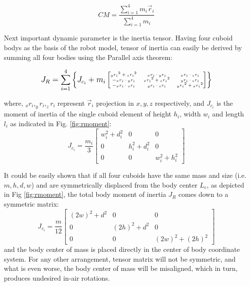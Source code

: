 \begin{equation}\label{eq:CMrobot}
CM=\frac{\sum_{i=1}^{4}m_i\vec{r}_i}{\sum_{i=1}^{4}m_i}
\end{equation}

Next important dynamic parameter is the inertia tensor. Having four cuboid bodys as the basis of the robot model, tensor of inertia can easily be derived by summing all four bodies using the Parallel axis theorem:

\begin{equation}
\tiny
J_R=\sum_{i=1}^{4}\left \{J_{c_i}+m_i\begin{bmatrix}
{_yr_i}^2+{_zr_i}^2 & {_xr_i}\cdot {_yr_i} & {_xr_i}\cdot {_zr_i} \\ 
-{_xr_i}\cdot {_yr_i} & {_xr_i}^2+{_zr_i}^2 & {_yr_i}\cdot {_zr_i}\\ 
-{_xr_i}\cdot {_zr_i} & {_yr_i}\cdot {_zr_i} & {_yr_i}^2+{_xr_i}^2
\end{bmatrix} \right \}
\normalsize
\end{equation}

where, $_xr_i, _yr_i, _zr_i$ represent $\vec{r}_i$ projection in $x,y,z$ respectively, and $J_{c_i}$ is the moment of inertia of the single cuboid element of height $h_i$, width $w_i$ and length $l_i$ as indicated in Fig. \ref{fig:rmoment}:
\begin{equation}
J_{c_i}=\frac{m_i}{3}\begin{bmatrix}
w_i^2+d_i^2 &0&0 \\ 
0 &h_i^2+d_i^2&0\\ 
0 &0& w_i^2+h_i^2
\end{bmatrix}
\end{equation} 

It could be easily shown that if all four cuboids have the same mass and size (i.e. $m,h,d,w$) and are symmetrically displaced from the body center $L_c$, as depicted in Fig \ref{fig:rmoment}, the total body moment of inertia $J_R$ comes down to a symmetric matrix: 
\begin{equation}
J_{c_i}=\frac{m}{12}\begin{bmatrix}
(2w)^2+d^2 &0&0 \\ 
0 &(2h)^2+d^2&0\\ 
0 &0& (2w)^2+(2h)^2
\end{bmatrix}
\end{equation} 
and the body center of mass is placed directly in the center of body coordinate system. For any other arrangement, tensor matrix will not be symmetric, and what is even worse, the body center of mass will be misaligned, which in turn, produces undesired in-air rotations.


